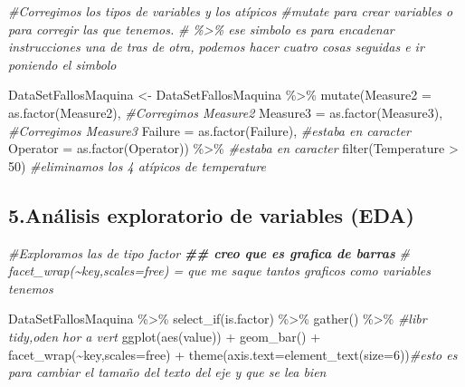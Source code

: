 \documentclass[
]{article}
\newenvironment{Shaded}{\begin{snugshade}}{\end{snugshade}}
\newcommand{\AttributeTok}[1]{\textcolor[rgb]{0.77,0.63,0.00}{#1}}
\newcommand{\CommentTok}[1]{\textcolor[rgb]{0.56,0.35,0.01}{\textit{#1}}}
\newcommand{\DecValTok}[1]{\textcolor[rgb]{0.00,0.00,0.81}{#1}}
\newcommand{\DocumentationTok}[1]{\textcolor[rgb]{0.56,0.35,0.01}{\textbf{\textit{#1}}}}
\newcommand{\FunctionTok}[1]{\textcolor[rgb]{0.00,0.00,0.00}{#1}}
\newcommand{\NormalTok}[1]{#1}
\newcommand{\OtherTok}[1]{\textcolor[rgb]{0.56,0.35,0.01}{#1}}
\newcommand{\SpecialCharTok}[1]{\textcolor[rgb]{0.00,0.00,0.00}{#1}}
\newcommand{\StringTok}[1]{\textcolor[rgb]{0.31,0.60,0.02}{#1}}
\begin{document}
\begin{Shaded}
\begin{Highlighting}[]
\CommentTok{\#Corregimos los tipos de variables y los atípicos}
\CommentTok{\#mutate para crear variables o para corregir las que tenemos.}
\CommentTok{\# \%\textgreater{}\% ese simbolo es para encadenar instrucciones una de tras de otra, podemos hacer cuatro cosas seguidas e ir poniendo el simbolo}

\NormalTok{DataSetFallosMaquina }\OtherTok{\textless{}{-}}\NormalTok{ DataSetFallosMaquina }\SpecialCharTok{\%\textgreater{}\%}
  \FunctionTok{mutate}\NormalTok{(}\AttributeTok{Measure2 =} \FunctionTok{as.factor}\NormalTok{(Measure2), }\CommentTok{\#Corregimos Measure2}
         \AttributeTok{Measure3 =} \FunctionTok{as.factor}\NormalTok{(Measure3), }\CommentTok{\#Corregimos Measure3 }
         \AttributeTok{Failure =} \FunctionTok{as.factor}\NormalTok{(Failure), }\CommentTok{\#estaba en caracter}
         \AttributeTok{Operator =} \FunctionTok{as.factor}\NormalTok{(Operator)) }\SpecialCharTok{\%\textgreater{}\%}  \CommentTok{\#estaba en caracter}
  \FunctionTok{filter}\NormalTok{(Temperature }\SpecialCharTok{\textgreater{}} \DecValTok{50}\NormalTok{) }\CommentTok{\#eliminamos los 4 atípicos de temperature}
\end{Highlighting}
\end{Shaded}

\hypertarget{anuxe1lisis-exploratorio-de-variables-eda}{%
\subsection{5.Análisis exploratorio de variables
(EDA)}\label{anuxe1lisis-exploratorio-de-variables-eda}}

\begin{Shaded}
\begin{Highlighting}[]
\CommentTok{\#Exploramos las de tipo factor}
\DocumentationTok{\#\# creo que es grafica de barras}
\CommentTok{\# facet\_wrap(\textasciitilde{}key,scales=\textquotesingle{}free\textquotesingle{}) = que me saque tantos graficos como variables tenemos}

\NormalTok{DataSetFallosMaquina }\SpecialCharTok{\%\textgreater{}\%}
  \FunctionTok{select\_if}\NormalTok{(is.factor) }\SpecialCharTok{\%\textgreater{}\%}
  \FunctionTok{gather}\NormalTok{() }\SpecialCharTok{\%\textgreater{}\%} \CommentTok{\#libr tidy,oden hor a vert}
  \FunctionTok{ggplot}\NormalTok{(}\FunctionTok{aes}\NormalTok{(value)) }\SpecialCharTok{+} \FunctionTok{geom\_bar}\NormalTok{() }\SpecialCharTok{+} \FunctionTok{facet\_wrap}\NormalTok{(}\SpecialCharTok{\textasciitilde{}}\NormalTok{key,}\AttributeTok{scales=}\StringTok{\textquotesingle{}free\textquotesingle{}}\NormalTok{) }\SpecialCharTok{+}
  \FunctionTok{theme}\NormalTok{(}\AttributeTok{axis.text=}\FunctionTok{element\_text}\NormalTok{(}\AttributeTok{size=}\DecValTok{6}\NormalTok{))}\CommentTok{\#esto es para cambiar el tamaño del texto del eje y que se lea bien}
\end{Highlighting}
\end{Shaded}
\end{document}
